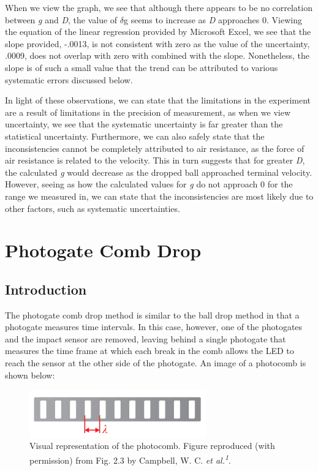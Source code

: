 \documentclass[titlepage]{article}
\begin{document}
When we view the graph, we see that although there appears to be no correlation between \textit{g} and \textit{D}, the value of $\delta$g seems to increase as \textit{D} approaches 0. Viewing the equation of the linear regression provided by Microsoft Excel, we see that the slope provided, -.0013, is not consistent with zero as the value of the uncertainty, .0009, does not overlap with zero with combined with the slope. Nonetheless, the slope is of such a small value that the trend can be attributed to various systematic errors discussed below.

In light of these observations, we can state that the limitations in the experiment are a result of limitations in the precision of measurement, as when we view uncertainty, we see that the systematic uncertainty is far greater than the statistical uncertainty. Furthermore, we can also safely state that the inconsistencies cannot be completely attributed to air resistance, as the force of air resistance is related to the velocity. This in turn suggests that for greater \textit{D}, the calculated \textit{g} would decrease as the dropped ball approached terminal velocity. However, seeing as how the calculated values for \textit{g} do not approach 0 for the range we measured in, we can state that the inconsistencies are most likely due to other factors, such as systematic uncertainties.

\pagebreak

\section{Photogate Comb Drop}

\subsection{Introduction}
The photogate comb drop method is similar to the ball drop method in that a photogate measures time intervals. In this case, however, one of the photogates and the impact sensor are removed, leaving behind a single photogate that measures the time frame at which each break in the comb allows the LED to reach the sensor at the other side of the photogate. An image of a photocomb is shown below:

\begin{figure}[!htbp]
    \centering
    \includegraphics[width=3.0in]{Comb.png}
    \caption{Visual representation of the photocomb. Figure reproduced
(with permission) from Fig. 2.3 by Campbell, W. C. \textit{et al.\textsuperscript{1}}.}
\end{figure}
\end{document}
